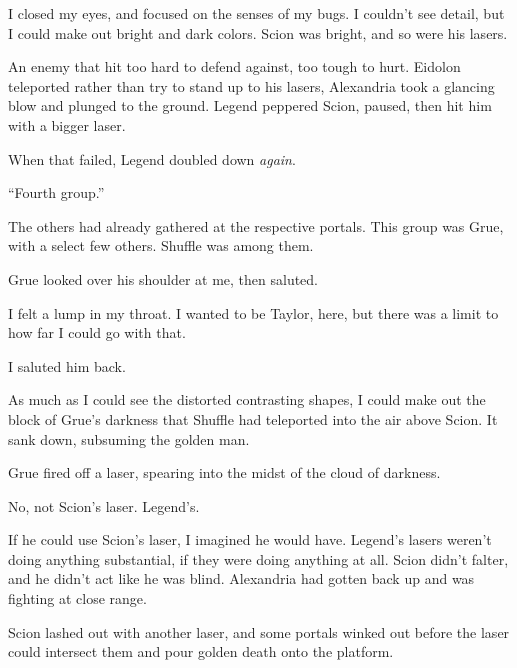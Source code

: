 I closed my eyes, and focused on the senses of my bugs.  I couldn't see detail, but I could make out bright and dark colors.  Scion was bright, and so were his lasers.



An enemy that hit too hard to defend against, too tough to hurt.  Eidolon teleported rather than try to stand up to his lasers, Alexandria took a glancing blow and plunged to the ground.  Legend peppered Scion, paused, then hit him with a bigger laser.



When that failed, Legend doubled down \emph{again}.



``Fourth group.''



The others had already gathered at the respective portals.  This group was Grue, with a select few others.  Shuffle was among them.



Grue looked over his shoulder at me, then saluted.



I felt a lump in my throat.  I wanted to be Taylor, here, but there was a limit to how far I could go with that.



I saluted him back.



As much as I could see the distorted contrasting shapes, I could make out the block of Grue's darkness that Shuffle had teleported into the air above Scion.  It sank down, subsuming the golden man.



Grue fired off a laser, spearing into the midst of the cloud of darkness.



No, not Scion's laser.  Legend's.



If he could use Scion's laser, I imagined he would have.  Legend's lasers weren't doing anything substantial, if they were doing anything at all.  Scion didn't falter, and he didn't act like he was blind.  Alexandria had gotten back up and was fighting at close range.



Scion lashed out with another laser, and some portals winked out before the laser could intersect them and pour golden death onto the platform.



